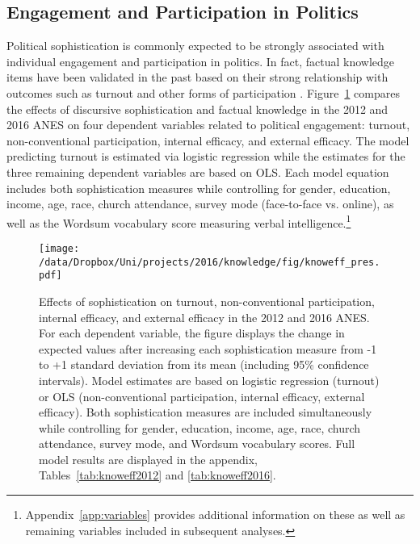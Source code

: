 \subsection*{Engagement and Participation in Politics}
Political sophistication is commonly expected to be strongly associated with individual engagement and participation in politics. In fact, factual knowledge items have been validated in the past based on their strong relationship with outcomes such as turnout and other forms of participation \citep[230--233]{lupia2015uninformed}. Figure~\ref{fig:knoweff} compares the effects of discursive sophistication and factual knowledge in the 2012 and 2016 ANES on four dependent variables related to political engagement: turnout, non-conventional participation, internal efficacy, and external efficacy. The model predicting turnout is estimated via logistic regression while the estimates for the three remaining dependent variables are based on OLS. Each model equation includes both sophistication measures while controlling for gender, education, income, age, race, church attendance, survey mode (face-to-face vs. online), as well as the Wordsum vocabulary score measuring verbal intelligence.\footnote{Appendix~\ref{app:variables} provides additional information on these as well as remaining variables included in subsequent analyses.}

\begin{figure}[h]\centering
\texttt{[image: /data/Dropbox/Uni/projects/2016/knowledge/fig/knoweff\_pres.pdf]}
\caption[Effects of sophistication on turnout, non-conventional participation, internal efficacy, and external efficacy in the 2012 and 2016 ANES]{Effects of sophistication on turnout, non-conventional participation, internal efficacy, and external efficacy in the 2012 and 2016 ANES. For each dependent variable, the figure displays the change in expected values after increasing each sophistication measure from -1 to +1 standard deviation from its mean (including 95\% confidence intervals). Model estimates are based on logistic regression (turnout) or OLS (non-conventional participation, internal efficacy, external efficacy). Both sophistication measures are included simultaneously while controlling for gender, education, income, age, race, church attendance, survey mode, and Wordsum vocabulary scores. Full model results are displayed in the appendix, Tables~\ref{tab:knoweff2012} and \ref{tab:knoweff2016}.}\label{fig:knoweff}
\end{figure}

